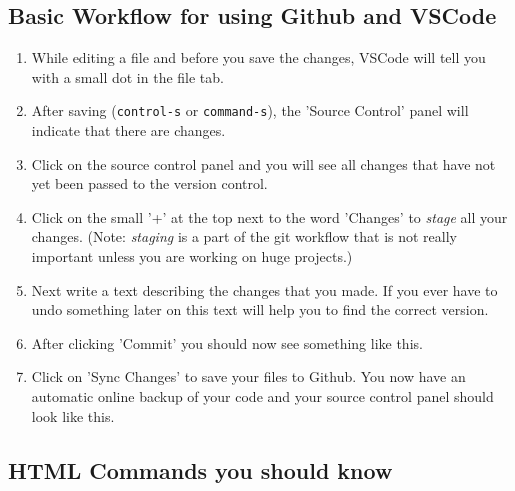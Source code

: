 \documentclass[english,11pt,a4paper]{report}
\begin{document}
\subsection{Basic Workflow for using Github and VSCode}
\begin{enumerate}
    \item While editing a file and before you save the changes, VSCode will tell you with a small dot in the file tab.
    \item After saving (\verb|control-s| or \verb|command-s|), the 'Source Control' panel will indicate that there are changes.
    \item Click on the source control panel and you will see all changes that have not yet been passed to the version control.
    \item Click on the small '+' at the top next to the word 'Changes' to \emph{stage} all your changes. (Note: \emph{staging} is a part of the git workflow that is not really important unless you are working on huge projects.)
    \item Next write a text describing the changes that you made. If you ever have to undo something later on this text will help you to find the correct version.
    \newpage
    \item After clicking 'Commit' you should now see something like this.
    \item Click on 'Sync Changes' to save your files to Github. You now have an automatic online backup of your code and your source control panel should look like this.
\end{enumerate}

\newpage
\subsection{HTML Commands you should know}
\end{document}
